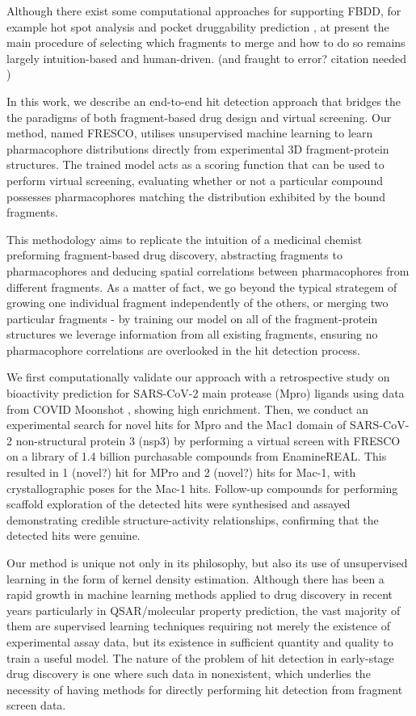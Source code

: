  Although there exist some computational approaches for supporting FBDD, for example hot spot analysis and pocket druggability prediction \cite{deSouza2020InSilicoFBDD}, at present the main procedure of selecting which fragments to merge and how to do so remains largely intuition-based and human-driven. (and fraught to error? citation needed \cite{?})

In this work, we describe an end-to-end hit detection approach that bridges the the paradigms of both fragment-based drug design and virtual screening. Our method, named FRESCO, utilises unsupervised machine learning to learn pharmacophore distributions directly from experimental 3D fragment-protein structures. The trained model acts as a scoring function that can be used to perform virtual screening, evaluating whether or not a particular compound possesses pharmacophores matching the distribution exhibited by the bound fragments. 

This methodology aims to replicate the intuition of a medicinal chemist preforming fragment-based drug discovery, abstracting fragments to pharmacophores and deducing spatial correlations between pharmacophores from different fragments. As a matter of fact, we go beyond the typical strategem of growing one individual fragment independently of the others, or merging two particular fragments - by training our model on all of the fragment-protein structures we leverage information from all existing fragments, ensuring no pharmacophore correlations are overlooked in the hit detection process.

We first computationally validate our approach with a retrospective study on bioactivity prediction for SARS-CoV-2 main protease (Mpro) ligands using data from COVID Moonshot \cite{Moonshot2022}, showing high enrichment. Then, we conduct an experimental search for novel hits for Mpro and the Mac1 domain of SARS-CoV-2 non-structural protein 3 (nsp3) by performing a virtual screen with FRESCO on a library of 1.4 billion purchasable compounds from EnamineREAL. This resulted in 1 (novel?) hit for MPro and 2 (novel?) hits for Mac-1, with crystallographic poses for the Mac-1 hits. Follow-up compounds for performing scaffold exploration of the detected hits were synthesised and assayed demonstrating credible structure-activity relationships, confirming that the detected hits were genuine.

Our method is unique not only in its philosophy, but also its use of unsupervised learning in the form of kernel density estimation. Although there has been a rapid growth in machine learning methods applied to drug discovery in recent years particularly in QSAR/molecular property prediction, the vast majority of them are supervised learning techniques requiring not merely the existence of experimental assay data, but its existence in sufficient quantity and quality to train a useful model. The nature of the problem of hit detection in early-stage drug discovery is one where such data in nonexistent, which underlies the necessity of having methods for directly performing hit detection from fragment screen data. 

